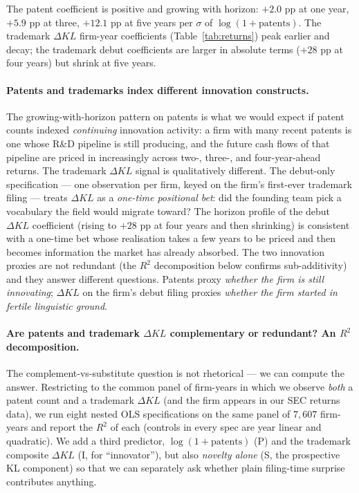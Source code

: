 \documentclass[11pt]{article}
\begin{document}
The patent coefficient is positive and growing with horizon:
$+2.0$ pp at one year, $+5.9$ pp at three, $+12.1$ pp at five years
per $\sigma$ of $\log(1+\text{patents})$. The trademark $\Delta KL$
firm-year coefficients (Table~\ref{tab:returns}) peak earlier and
decay; the trademark debut coefficients are larger in absolute terms
($+28$ pp at four years) but shrink at five years.

\paragraph{Patents and trademarks index different innovation
constructs.} The growing-with-horizon pattern on patents is what we
would expect if patent counts indexed \emph{continuing} innovation
activity: a firm with many recent patents is one whose R\&D pipeline
is still producing, and the future cash flows of that pipeline are
priced in increasingly across two-, three-, and four-year-ahead
returns. The trademark $\Delta KL$ signal is qualitatively
different. The debut-only specification --- one observation per firm,
keyed on the firm's first-ever trademark filing --- treats $\Delta KL$
as a \emph{one-time positional bet}: did the founding team pick a
vocabulary the field would migrate toward? The horizon profile of
the debut $\Delta KL$ coefficient (rising to $+28$ pp at four years
and then shrinking) is consistent with a one-time bet whose
realisation takes a few years to be priced and then becomes
information the market has already absorbed. The two innovation
proxies are not redundant (the $R^2$ decomposition below confirms
sub-additivity) and they answer different questions. Patents proxy
\emph{whether the firm is still innovating}; $\Delta KL$ on the
firm's debut filing proxies \emph{whether the firm started in
fertile linguistic ground}.

\paragraph{Are patents and trademark $\Delta KL$ complementary or
redundant? An $R^2$ decomposition.}
The complement-vs-substitute question is not rhetorical --- we can
compute the answer. Restricting to the common panel of firm-years
in which we observe \emph{both} a patent count and a trademark
$\Delta KL$ (and the firm appears in our SEC returns data), we run
eight nested OLS specifications on the same panel of $7{,}607$
firm-years and report the $R^2$ of each (controls in every spec are
year linear and quadratic). We add a third predictor, $\log(1+
\text{patents})$ (P) and the trademark composite $\Delta KL$ (I, for
``innovator''), but also \emph{novelty alone} (S, the prospective
KL component) so that we can separately ask whether plain
filing-time surprise contributes anything.
\end{document}

